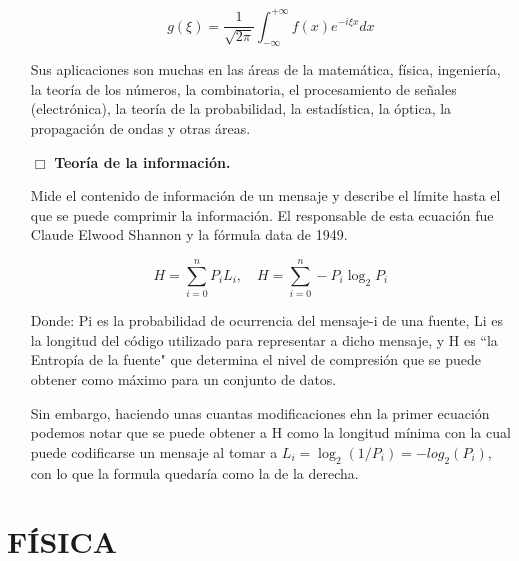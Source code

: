 \documentclass[12pt,letterpaper]{article}
\begin{document}
\begin{itemize}
    $$g(\xi )=\frac{1}{\sqrt{2\pi }}\int_{-\infty }^{+\infty }f(x)e^{-i\xi x}dx$$

    Sus aplicaciones son muchas en las áreas de la matemática, física, ingeniería, la teoría de los números, la combinatoria, el procesamiento de señales (electrónica), la teoría de la probabilidad, la estadística, la óptica, la propagación de ondas y otras áreas.\newline

    \item[$\Box$] \textbf{Teoría de la información.}\newline
    
    Mide el contenido de información de un mensaje y describe el límite hasta el que se puede comprimir la información. El responsable de esta ecuación fue Claude Elwood Shannon y la fórmula data de 1949.
    
    $$H=\sum_{i=0}^{n}P_{i}L_{i}, \quad H=\sum_{i=0}^{n}-P_{i}\log_{2}P_{i}$$

    Donde: Pi es la probabilidad de ocurrencia del mensaje-i de una fuente, Li es la longitud del código utilizado para representar a dicho mensaje, y H es ``la Entropía de la fuente" que determina el nivel de compresión que se puede obtener como máximo para un conjunto de datos.\newline

    Sin embargo, haciendo unas cuantas modificaciones ehn la primer ecuación podemos notar que se puede obtener a H como la longitud mínima con la cual puede codificarse un mensaje al tomar a $L_{i}=\log_{2}(1/P_{i})=-log_{2}(P_{i})$, con lo que la formula quedaría como la de la derecha.

\end{itemize}
\newpage

    \pagestyle{fancy}
            \fancyhf{}
            \rhead{\textcolor{white}{\thepage}}
            \cfoot{\textcolor{white}{Jordán Aarón Duarte Martínez}}

\section*{FÍSICA}
\end{document}
